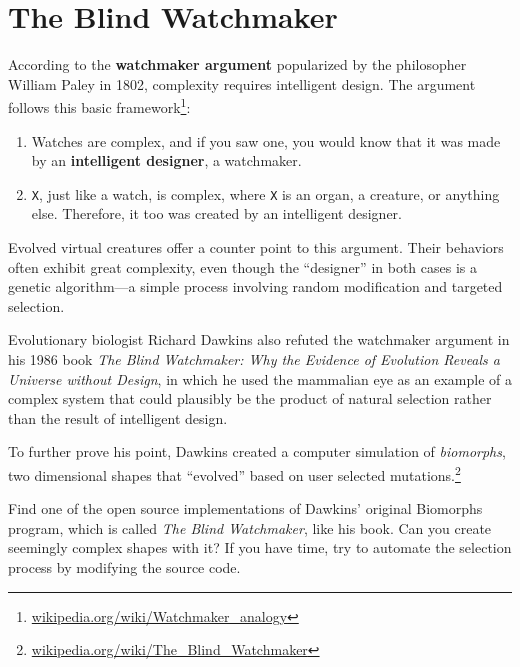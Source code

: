 \documentclass[10pt]{book}
\begin{document}
\section{The Blind Watchmaker}

According to the {\bf watchmaker argument} popularized by the philosopher William Paley in 1802,
complexity requires intelligent design. The argument follows this basic
framework\footnote{\url{wikipedia.org/wiki/Watchmaker_analogy}}:

\begin{enumerate}
  \item Watches are complex, and if you saw one, you would know that it was made
  by an {\bf intelligent designer}, a watchmaker.

  \item {\tt X}, just like a watch, is complex, where {\tt X} is an organ, a
  creature, or anything else. Therefore, it too was created by
  an intelligent designer.
\end{enumerate}

Evolved virtual creatures offer a counter point to this argument.
Their behaviors often exhibit great complexity, even though the ``designer'' in both cases is a genetic algorithm---a simple process 
involving random modification and targeted selection.

Evolutionary biologist Richard Dawkins also refuted the watchmaker argument in his 1986 book
{\em The Blind Watchmaker: Why the Evidence of Evolution Reveals a Universe
without Design}, in which he used the mammalian eye as an example of a complex
system that could plausibly be the product of natural selection rather than the
result of intelligent design.

To further prove his point, Dawkins created a computer simulation of {\em
biomorphs}, two dimensional shapes that ``evolved'' based on user selected
mutations.\footnote{\url{wikipedia.org/wiki/The_Blind_Watchmaker}}


\begin{ex} 


  Find one of the open source implementations of Dawkins' original Biomorphs
  program, which is called {\em The Blind Watchmaker}, like his book. Can you create 
  seemingly complex shapes with it? If you have time, try to automate the selection process
  by modifying the source code. 
\end{ex}

\printindex

\clearemptydoublepage

\end{document}
